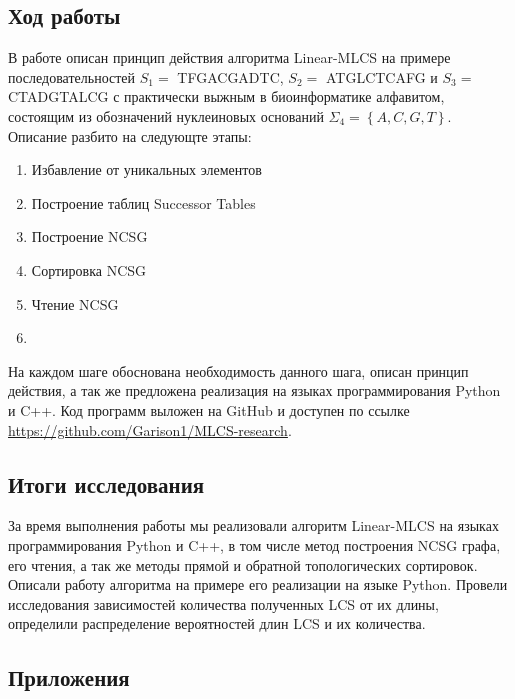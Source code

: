 \documentclass[a4paper,12pt]{extarticle}
\begin{document}
\vspace{-0.5cm}
\subsection*{Ход работы}
\vspace{-0.2cm}
В работе описан принцип действия алгоритма Linear-MLCS на примере последовательностей $S_{1} =$ TFGACGADTC, $S_{2} =$ ATGLCTCAFG и $S_{3} =$ CTADGTALCG с практически выжным в биоинформатике алфавитом, состоящим из обозначений нуклеиновых оснований $\Sigma_{4} = \left\{A, C, G, T\right\}$. Описание разбито на следующте этапы:
\begin{multicols}{2}
  \begin{enumerate}[leftmargin=0.7cm]
    \item Избавление от уникальных элементов
    \item Построение таблиц Successor Tables
    \item Построение NCSG
    \item Сортировка NCSG
    \item Чтение NCSG
    \item[]
  \end{enumerate}
\end{multicols}

На каждом шаге обоснована необходимость данного шага, описан принцип действия, а так же предложена реализация на языках программирования Python и C++. Код программ выложен на GitHub и доступен по ссылке \href{https://github.com/Garison1/MLCS-research}{https://github.com/Garison1/MLCS-research}.

\subsection*{Итоги исследования}
За время выполнения работы мы реализовали алгоритм Linear-MLCS на языках программирования Python и C++, в том числе метод построения NCSG графа, его чтения, а так же методы прямой и обратной топологических сортировок. Описали работу алгоритма на примере его реализации на языке Python. Провели исследования зависимостей количества полученных LCS от их длины, определили распределение вероятностей длин LCS и их количества. \nocite{1}

\printbibliography[heading=subbibintoc]

\subsection*{\textbf{Приложения}}
\end{document}
